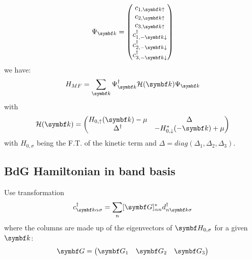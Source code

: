 \documentclass[../notes.tex]{subfiles}
\begin{document}
\begin{equation}
	\Psi_{\vb{k}} =
	\begin{pmatrix}
		c_{1, \vb{k} \uparrow} \\
		c_{2, \vb{k} \uparrow} \\
		c_{3, \vb{k} \uparrow} \\
		c_{1, -\vb{k} \downarrow}^{\dagger} \\
		c_{2, -\vb{k} \downarrow}^{\dagger} \\
		c_{3, -\vb{k} \downarrow}^{\dagger} \\
	\end{pmatrix}
\end{equation}
we have:
\begin{equation}
	H_{MF} = \sum_{\vb{k}} \Psi_{\vb{k}}^{\dagger} \mathcal{H} (\vb{k}) \Psi_{\vb{k}}
\end{equation}
with
\begin{equation}
	\mathcal{H} (\vb{k}) =
	\begin{pmatrix}
		H_{0, \uparrow} (\vb{k}) - \mu & \Delta \\
		\Delta^{\dagger} & - H_{0, \downarrow}^* (-\vb{k}) + \mu
	\end{pmatrix}
\end{equation}
with \(H_{0, \sigma}\) being the F.T. of the kinetic term and \(\Delta = diag(\Delta_1, \Delta_2, \Delta_3)\).


\subsection{BdG Hamiltonian in band basis}

Use transformation
\begin{equation}
	c_{\vb{k} \alpha \sigma}^{\dagger} = \sum_{n} [\mat{G}]_{\alpha n}^* d_{n \vb{k} \sigma}^{\dagger}
\end{equation}
where the columns are made up of the eigenvectors of \(\mat{H}_{0, \sigma}\) for a given \(\vb{k}\):
\begin{equation}
	\mat{G} = 
	\begin{pmatrix}
		\vb{G}_1 & \vb{G}_2 & \vb{G}_3
	\end{pmatrix}
\end{equation}
\end{document}

